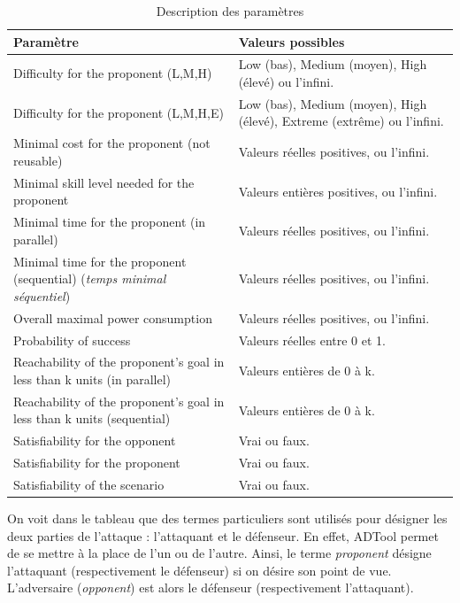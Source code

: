 \begin{table}[!h]
	\centering
	\begin{tabular}{|p{6cm}|p{5cm}|}
  \hline
  \textbf{Paramètre} & \textbf{Valeurs possibles} \\
  \hline
  Difficulty for the proponent (L,M,H) & 
 Low (bas), Medium (moyen), High (élevé) ou l'infini.
\\ \hline
Difficulty for the proponent (L,M,H,E) & 
Low (bas), Medium (moyen), High (élevé), Extreme (extrême) ou l'infini.
\\ \hline
Minimal cost for the proponent (not reusable) & 
Valeurs réelles positives, ou l'infini.\\ \hline
  Minimal skill level needed for the proponent
  & Valeurs entières positives, ou l'infini.\\ \hline
  Minimal time for the proponent (in parallel)
  & Valeurs réelles positives, ou l'infini.\\ \hline
  Minimal time for the proponent (sequential) (\textit{temps minimal séquentiel})
  & Valeurs réelles positives, ou l'infini.\\ \hline
  Overall maximal power consumption & 
  Valeurs réelles positives, ou l'infini.\\ \hline
  Probability of success &
  Valeurs réelles entre 0 et 1.\\ \hline
  Reachability of the proponent's goal in less than k units (in parallel)
  & Valeurs entières de 0 à k. \\ \hline
  Reachability of the proponent's goal in less than k units (sequential)
  & Valeurs entières de 0 à k. \\ \hline
  Satisfiability for the opponent
  & Vrai ou faux. \\ \hline
  Satisfiability for the proponent
  & Vrai ou faux. \\ \hline
  Satisfiability of the scenario
  & Vrai ou faux. \\
  \hline
\end{tabular}
	\caption{Description des paramètres}
	\label{tab:DescriptionParam}
\end{table}

On voit dans le tableau que des termes particuliers sont utilisés pour désigner les deux parties de l'attaque : l'attaquant et le défenseur. En effet, ADTool permet de se mettre à la place de l'un ou de l'autre. Ainsi, le terme \textit{proponent} désigne l'attaquant (respectivement le défenseur) si on désire son point de vue. L'adversaire (\textit{opponent}) est alors le défenseur (respectivement l'attaquant). %

